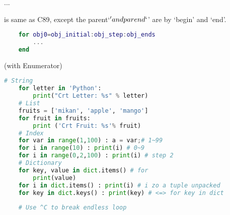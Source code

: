 

...

 is same as C89, except the parent`\(' and parend`\)' are by `begin' and `end'.


\begin{lstlisting}[language=MATLAB]
	% obj_initial~obj_ends. step can be omitted and default one
	for obj0=obj_initial:obj_step:obj_ends
		...
	end
\end{lstlisting}


 (with Enumerator)
\begin{lstlisting}[language=Python]
	# String
	for letter in 'Python':
		print("Crt Letter: %s" % letter)
	# List
	fruits = ['mikan', 'apple', 'mango']
	for fruit in fruits:
		print ('Crt Fruit: %s'% fruit)
	# Index
	for var in range(1,100) : a = var;# 1~99
	for i in range(10) : print(i) # 0~9
	for i in range(0,2,100) : print(i) # step 2
	# Dictionary
	for key, value in dict.items() # for 
		print(value)
	for i in dict.items() : print(i) # i zo a tuple unpacked
	for key in dict.keys() : print(key) # <=> for key in dict
	
	# Use ^C to break endless loop
\end{lstlisting}
